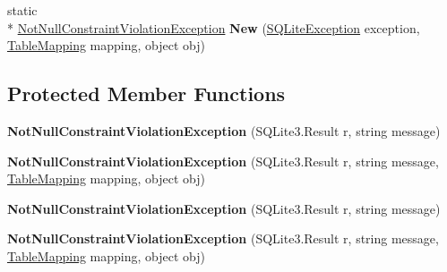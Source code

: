 \begin{DoxyCompactItemize}
\item 
\hypertarget{classSQLite_1_1NotNullConstraintViolationException_a25c290bafcea136ebd06b2959bf20c3c}{static \\*
\hyperlink{classSQLite_1_1NotNullConstraintViolationException}{Not\-Null\-Constraint\-Violation\-Exception} {\bfseries New} (\hyperlink{classSQLite_1_1SQLiteException}{S\-Q\-Lite\-Exception} exception, \hyperlink{classSQLite_1_1TableMapping}{Table\-Mapping} mapping, object obj)}\label{classSQLite_1_1NotNullConstraintViolationException_a25c290bafcea136ebd06b2959bf20c3c}

\end{DoxyCompactItemize}
\subsection*{Protected Member Functions}
\begin{DoxyCompactItemize}
\item 
\hypertarget{classSQLite_1_1NotNullConstraintViolationException_a6c1cdcfe9c9289aefb428bc42861a376}{{\bfseries Not\-Null\-Constraint\-Violation\-Exception} (S\-Q\-Lite3.\-Result r, string message)}\label{classSQLite_1_1NotNullConstraintViolationException_a6c1cdcfe9c9289aefb428bc42861a376}

\item 
\hypertarget{classSQLite_1_1NotNullConstraintViolationException_a1323d85e646b1eb71943d03619291677}{{\bfseries Not\-Null\-Constraint\-Violation\-Exception} (S\-Q\-Lite3.\-Result r, string message, \hyperlink{classSQLite_1_1TableMapping}{Table\-Mapping} mapping, object obj)}\label{classSQLite_1_1NotNullConstraintViolationException_a1323d85e646b1eb71943d03619291677}

\item 
\hypertarget{classSQLite_1_1NotNullConstraintViolationException_a6c1cdcfe9c9289aefb428bc42861a376}{{\bfseries Not\-Null\-Constraint\-Violation\-Exception} (S\-Q\-Lite3.\-Result r, string message)}\label{classSQLite_1_1NotNullConstraintViolationException_a6c1cdcfe9c9289aefb428bc42861a376}

\item 
\hypertarget{classSQLite_1_1NotNullConstraintViolationException_a1323d85e646b1eb71943d03619291677}{{\bfseries Not\-Null\-Constraint\-Violation\-Exception} (S\-Q\-Lite3.\-Result r, string message, \hyperlink{classSQLite_1_1TableMapping}{Table\-Mapping} mapping, object obj)}\label{classSQLite_1_1NotNullConstraintViolationException_a1323d85e646b1eb71943d03619291677}

\end{DoxyCompactItemize}
